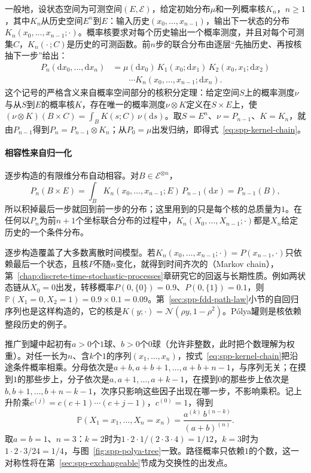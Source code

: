 一般地，设状态空间为可测空间$(E,\mathcal E)$，给定初始分布$\mu$和一列概率核$K_n$，$n\ge1$，其中$K_n$从历史空间$E^n$到$E$：输入历史$(x_0,\ldots,x_{n-1})$，输出下一状态的分布$K_n(x_0,\ldots,x_{n-1};\cdot)$。概率核要求对每个历史输出一个概率测度，并且对每个可测集$C$，$K_n(\cdot\,;C)$是历史的可测函数。前$n$步的联合分布由逐层“先抽历史、再按核抽下一步”给出：
\begin{equation}
  \begin{aligned}
  P_n(\mathrm dx_0,\ldots,\mathrm dx_n)
  &=\mu(\mathrm dx_0)\,K_1(x_0;\mathrm dx_1)\,K_2(x_0,x_1;\mathrm dx_2)\\
  &\qquad\cdots K_n(x_0,\ldots,x_{n-1};\mathrm dx_n).
  \end{aligned}
  \label{eq:spp-kernel-chain}
\end{equation}
这个记号的严格含义来自概率空间部分的核积分定理：给定空间$S$上的概率测度$\nu$与从$S$到$E$的概率核$K$，存在唯一的概率测度$\nu\otimes K$定义在$S\times E$上，使$(\nu\otimes K)(B\times C)=\int_BK(s;C)\,\nu(\mathrm ds)$。取$S=E^n$、$\nu=P_{n-1}$、$K=K_n$，就由$P_{n-1}$得到$P_n=P_{n-1}\otimes K_n$；从$P_0=\mu$出发归纳，即得式~\eqref{eq:spp-kernel-chain}。

\paragraph{相容性来自归一化}
逐步构造的有限维分布自动相容。对$B\in\mathcal E^{\otimes n}$，
\[
  P_n(B\times E)=\int_BK_n(x_0,\ldots,x_{n-1};E)\,P_{n-1}(\mathrm dx)=P_{n-1}(B),
\]
所以积掉最后一步就回到前一步的分布；这里用到的只是每个核的总质量为$1$。在任何以$P_n$为前$n+1$个坐标联合分布的过程中，$K_n(X_0,\ldots,X_{n-1};\cdot)$都是$X_n$给定历史的一个条件分布。

逐步构造覆盖了大多数离散时间模型。若$K_n(x_0,\ldots,x_{n-1};\cdot)=P(x_{n-1},\cdot)$只依赖最后一个状态，且核$P$不随$n$变化，就得到时间齐次的（Markov chain），第~\ref{chap:discrete-time-stochastic-processes}章研究它的回返与长期性质。例如两状态链从$X_0=0$出发，转移概率$P(0,\{0\})=0.9$、$P(0,\{1\})=0.1$，则$\mathbb P(X_1=0,X_2=1)=0.9\times0.1=0.09$。第~\ref{sec:spp-fdd-path-law}小节的自回归序列也是这样构造的，它的核是$K(y;\cdot)=\mathcal N(\rho y,1-\rho^2)$。Pólya罐则是核依赖整段历史的例子。

\begin{example}[Pólya罐的路径概率]
\label{ex:spp-polya-path}
推广到罐中起初有$a>0$个$1$球、$b>0$个$0$球（允许非整数，此时把个数理解为权重）。对任一长为$n$、含$k$个$1$的序列$(x_1,\ldots,x_n)$，按式~\eqref{eq:spp-kernel-chain}把沿途条件概率相乘。分母依次是$a+b,a+b+1,\ldots,a+b+n-1$，与序列无关；在摸到$1$的那些步上，分子依次是$a,a+1,\ldots,a+k-1$，在摸到$0$的那些步上依次是$b,b+1,\ldots,b+n-k-1$，次序只影响这些因子出现在哪一步，不影响乘积。记上升阶乘$c^{(j)}=c(c+1)\cdots(c+j-1)$，$c^{(0)}=1$，得到
\begin{equation}
  \mathbb P(X_1=x_1,\ldots,X_n=x_n)=\frac{a^{(k)}\,b^{(n-k)}}{(a+b)^{(n)}} .
  \label{eq:spp-polya-path}
\end{equation}
取$a=b=1$、$n=3$：$k=2$时为$1\cdot2\cdot1/(2\cdot3\cdot4)=1/12$，$k=3$时为$1\cdot2\cdot3/24=1/4$，与图~\ref{fig:spp-polya-tree}一致。路径概率只依赖$1$的个数，这一对称性将在第~\ref{sec:spp-exchangeable}节成为交换性的出发点。
\end{example}

